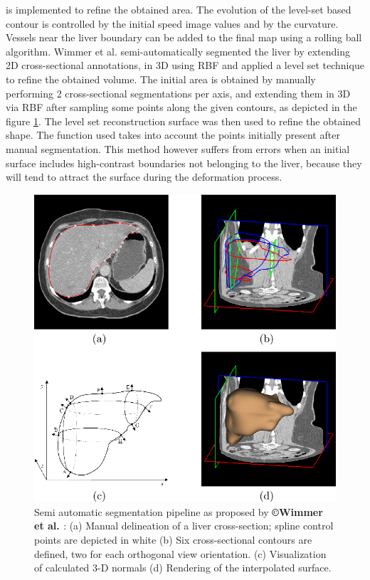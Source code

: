 is implemented to refine the obtained area. The evolution of the
level-set based contour is controlled by the initial speed image values
and by the curvature. Vessels near the liver boundary can be added to
the final map using a rolling ball algorithm.
Wimmer et al. \cite{Wimmer2007} semi-automatically segmented the liver by extending 2D
cross-sectional annotations, in 3D using RBF and applied a level set
technique to refine the obtained volume. The initial area is obtained by
manually performing 2 cross-sectional segmentations per axis, and
extending them in 3D via RBF after sampling some points along the given
contours, as depicted in the figure \ref{Wimmer2007_Fig2}.
The level set reconstruction surface was then used to refine the
obtained shape. The function used takes into account the points
initially present after manual segmentation. This method however suffers
from errors when an initial surface includes high-contrast boundaries
not belonging to the liver, because they will tend to attract the
surface during the deformation process.


\begin{figure} [ht!]
	\centering
	\includegraphics[width=0.5\linewidth]{images/Wimmer2007_Fig2}
	\caption{Semi automatic segmentation pipeline as proposed by \textbf{©Wimmer et al. \cite{Wimmer2007}}: (a) Manual delineation of a liver cross-section; spline control points are depicted in white (b) Six cross-sectional contours are defined, two for each orthogonal view orientation. (c) Visualization of calculated 3-D normals (d) Rendering of the interpolated surface.}
	\label{Wimmer2007_Fig2}
\end{figure}


